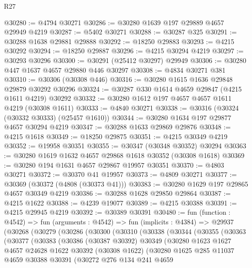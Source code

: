 \begin{lexlean}{R27}
\begin{coremodule}
@30280 := @4794 @30271
@30286 := @30280 @1639 @197 @29889 @4657 @29949 @4219
@30287 := @5402 @30271
@30288 := @30287 @325
@30291 := @30288 @1638 @29881 @29888
@30292 := @18250 @29883
@30293 := @4215 @30292
@30294 := @18250 @29887
@30296 := @4215 @30294 @4219
@30297 := @30293 @30296
@30300 := @30291 (@25412 @30297) @29949
@30306 := @30280 @447 @1637 @4657 @29880 @446 @30297
@30308 := @4834 @30271 @381
@30310 := @30306 (@30308 @446)
@30316 := @30280 @1615 @1636 @29848 @29879 @30292 @30296
@30324 := @30287 @330 @1614 @4659 @29847 (@4215 @1611 @4219) @30292
@30332 := @30280 @1612 @197 @4657 @4657 @1611 @4219 (@30308 @1611)
@30333 := @4840 @30271
@30338 := @30316 (@30324 (@30332 @30333) (@25457 @1610))
@30344 := @30280 @1634 @197 @29877 @4657 @30294 @4219
@30347 := @30288 @1633 @29869 @29876
@30348 := @4215 @1618
@30349 := @18250 @29875
@30351 := @4215 @30349 @4219
@30352 := @19958 @30351
@30355 := @30347 (@30348 @30352) @30294
@30363 := @30280 @1619 @1632 @4657 @29868 @1618 @30352 (@30308 @1618)
@30369 := @30280 @194 @1631 @4657 @29867 @19957 @30351
@30370 := @4803 @30271
@30372 := @30370 @41 @19957
@30373 := @4809 @30271
@30377 := @30369 (@30372 (@4808 (@30373 @41)))
@30383 := @30280 @1629 @197 @29865 @4657 @30349 @4219
@30386 := @30288 @1628 @29850 @29864
@30387 := @4215 @1622
@30388 := @4239 @19077
@30389 := @4215 @30388
@30391 := @4215 @29945 @4219
@30392 := @30389 @30391
@30480 := fun (function : @4542) =>
  fun (arguments : @4542) =>
  fun (implicits : @4384) =>
  @29937
    (@30268
      (@30279
        (@30286
          (@30300
            (@30310
              (@30338
                (@30344
                  (@30355
                    (@30363
                      (@30377
                        (@30383
                          (@30386
                            (@30387 @30392)
                            @30349
                            (@30280
                              @1623
                              @1627
                              @4657
                              @24628
                              @1622
                              @30392
                              (@30308 @1622)
                              (@30280
                                @1625
                                @285
                                @11037
                                @4659
                                @30388
                                @30391
                                (@30272
                                  @276
                                  @134
                                  @241
                                  @4659

\end{coremodule}
\end{lexlean}
